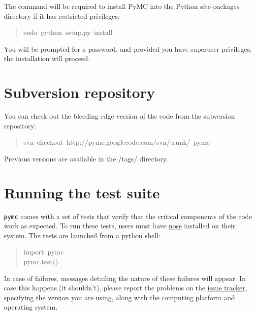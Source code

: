 The  command will be required to install PyMC into the Python site-packages 
directory if it has restricted privileges:
\begin{quote}{\ttfamily \raggedright \noindent
sudo~python~setup.py~install
}\end{quote}

You will be prompted for a  password, and provided you have superuser privileges, 
the installation will proceed.



\hypertarget{subversion-repository}{}
\section*{Subversion repository}

You can check out the bleeding edge version of the code from the subversion 
repository:
\begin{quote}{\ttfamily \raggedright \noindent
svn~checkout~http://pymc.googlecode.com/svn/trunk/~pymc
}\end{quote}

Previous versions are available in the /tags/ directory.



\hypertarget{running-the-test-suite}{}
\section*{Running the test suite}

\texttt{pymc} comes with a set of tests that verify that the critical components
of the code work as expected. To run these tests, users must have \href{http://somethingaboutorange.com/mrl/projects/nose/}{nose}
installed on their system. The tests are launched from a python shell:
\begin{quote}{\ttfamily \raggedright \noindent
import~pymc~\\
pymc.test()
}\end{quote}

In case of failures, messages detailing the nature of these failures will 
appear. In case this happens (it shouldn't), please report
the problems on the \href{http://code.google.com/p/pymc/issues/list.}{issue tracker}, specifying the version you are using, along with the computing platform and operating system.


